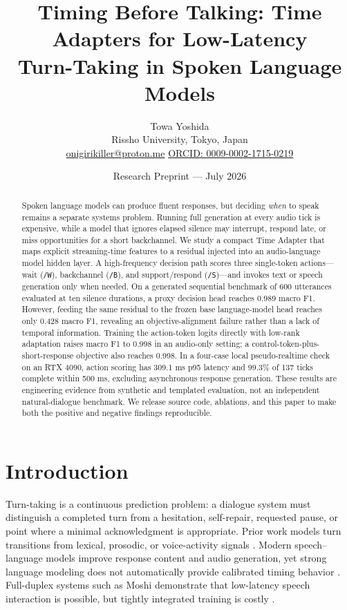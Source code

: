 \documentclass[10pt,twocolumn]{article}
\title{\vspace{-1.4em}\textbf{Timing Before Talking: Time Adapters for Low-Latency\\Turn-Taking in Spoken Language Models}}
\author{Towa Yoshida\\
Rissho University, Tokyo, Japan\\
\href{mailto:onigirikiller@proton.me}{onigirikiller@proton.me}\quad
\href{https://orcid.org/0009-0002-1715-0219}{ORCID: 0009-0002-1715-0219}}
\date{Research Preprint --- July 2026}
\newcommand{\adapter}{Time Adapter}
\newcommand{\code}[1]{\texttt{#1}}
\begin{document}
\maketitle

\begin{abstract}
Spoken language models can produce fluent responses, but deciding \emph{when} to speak remains a separate systems problem. Running full generation at every audio tick is expensive, while a model that ignores elapsed silence may interrupt, respond late, or miss opportunities for a short backchannel. We study a compact \adapter{} that maps explicit streaming-time features to a residual injected into an audio-language model hidden layer. A high-frequency decision path scores three single-token actions---wait (\code{/W}), backchannel (\code{/B}), and support/respond (\code{/S})---and invokes text or speech generation only when needed. On a generated sequential benchmark of 600 utterances evaluated at ten silence durations, a proxy decision head reaches 0.989 macro F1. However, feeding the same residual to the frozen base language-model head reaches only 0.428 macro F1, revealing an objective-alignment failure rather than a lack of temporal information. Training the action-token logits directly with low-rank adaptation raises macro F1 to 0.998 in an audio-only setting; a control-token-plus-short-response objective also reaches 0.998. In a four-case local pseudo-realtime check on an RTX 4090, action scoring has 309.1 ms p95 latency and 99.3\% of 137 ticks complete within 500 ms, excluding asynchronous response generation. These results are engineering evidence from synthetic and templated evaluation, not an independent natural-dialogue benchmark. We release source code, ablations, and this paper to make both the positive and negative findings reproducible.
\end{abstract}

\section{Introduction}

Turn-taking is a continuous prediction problem: a dialogue system must distinguish a completed turn from a hesitation, self-repair, requested pause, or point where a minimal acknowledgment is appropriate. Prior work models turn transitions from lexical, prosodic, or voice-activity signals \cite{skantze2017continuous,ekstedt2020turngpt,ekstedt2022vap,leishman2026lexical}. Modern speech--language models improve response content and audio generation, yet strong language modeling does not automatically provide calibrated timing behavior \cite{umair2024when}. Full-duplex systems such as Moshi demonstrate that low-latency speech interaction is possible, but tightly integrated training is costly \cite{defossez2024moshi}.
\end{document}
